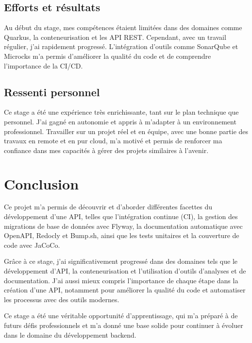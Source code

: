 \documentclass[11pt]{article}
\begin{document}
		\subsection*{Efforts et résultats}
		
		Au début du stage, mes compétences étaient limitées dans des domaines comme Quarkus, la conteneurisation et les API REST. Cependant, avec un travail régulier, j'ai rapidement progressé. L'intégration d'outils comme SonarQube et Microcks m'a permis d'améliorer la qualité du code et de comprendre l'importance de la CI/CD.
		
		\subsection*{Ressenti personnel}
		
			Ce stage a été une expérience très enrichissante, tant sur le plan technique que personnel. J'ai gagné en autonomie et appris à m'adapter à un environnement professionnel. Travailler sur un projet réel et en équipe, avec une bonne partie des travaux en remote et en pur cloud, m'a motivé et permis de renforcer ma confiance dans mes capacités à gérer des projets similaires à l'avenir.
		
	\section{Conclusion}
	
		Ce projet m'a permis de découvrir et d’aborder différentes facettes du développement d'une API, telles que l'intégration continue (CI), la gestion des migrations de base de données avec Flyway, la documentation automatique avec OpenAPI, Redocly et Bump.sh, ainsi que les tests unitaires et la couverture de code avec JaCoCo.
		
		\vspace{0.2cm}
		
		Grâce à ce stage, j’ai significativement progressé dans des domaines tels que le développement d'API, la conteneurisation et l’utilisation d’outils d'analyses et de documentation. J’ai aussi mieux compris l’importance de chaque étape dans la création d’une API, notamment pour améliorer la qualité du code et automatiser les processus avec des outils modernes.
		
		\vspace{0.2cm}
		
		Ce stage a été une véritable opportunité d’apprentissage, qui m’a préparé à de futurs défis professionnels et m’a donné une base solide pour continuer à évoluer dans le domaine du développement backend.
\end{document}
